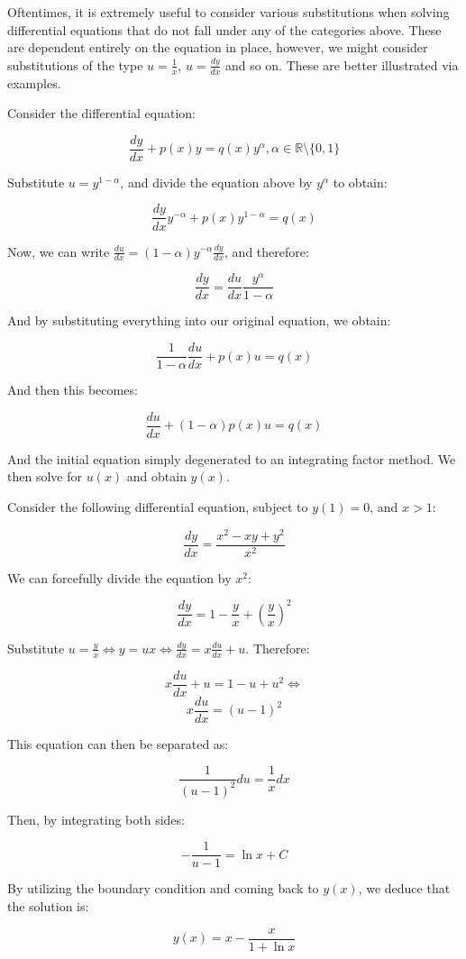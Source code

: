 \documentclass[12pt]{article}
\begin{document}
Oftentimes, it is extremely useful to consider various substitutions when solving differential equations that do not fall under any of the categories above. These are dependent entirely on the equation in place, however, we might consider substitutions of the type $u = \frac{1}{x}$, $u = \frac{dy}{dx}$ and so on. These are better illustrated via examples.

\begin{example}
    Consider the differential equation:

    \[ \frac{dy}{dx} + p(x)y = q(x)y^\alpha, \alpha \in \mathbb{R} \setminus \{0, 1\} \]

    Substitute $u = y^{1 - \alpha}$, and divide the equation above by $y^\alpha$ to obtain:

    \[ \frac{dy}{dx}y^{-\alpha} + p(x)y^{1 - \alpha} = q(x) \]

    Now, we can write $\frac{du}{dx} = (1 - \alpha)y^{-\alpha}\frac{dy}{dx}$, and therefore:

    \[ \frac{dy}{dx} = \frac{du}{dx}\frac{y^\alpha}{1 - \alpha} \]

    And by substituting everything into our original equation, we obtain:

    \[ \frac{1}{1 - \alpha}\frac{du}{dx} + p(x)u = q(x) \]

    And then this becomes:

    \[ \frac{du}{dx} + (1 - \alpha)p(x)u = q(x) \]

    And the initial equation simply degenerated to an integrating factor method. We then solve for $u(x)$ and obtain $y(x)$.
\end{example}

\begin{example}[Substitutions of the type $u = \frac{y}{x}$]
    Consider the following differential equation, subject to $y(1) = 0$, and $x > 1$: 

    \[ \frac{dy}{dx} = \frac{x^2 - xy + y^2}{x^2} \]

    We can forcefully divide the equation by $x^2$:

    \[ \frac{dy}{dx} = 1 - \frac{y}{x} + \left(\frac{y}{x}\right)^2 \]

    Substitute $u = \frac{y}{x} \Leftrightarrow y = ux \Leftrightarrow \frac{dy}{dx} = x\frac{du}{dx} + u$. Therefore:

    \[ x\frac{du}{dx} + u = 1 - u + u^2 \Leftrightarrow \]
    \[ x\frac{du}{dx} = (u - 1)^2 \]

    This equation can then be separated as:

    \[ \frac{1}{(u - 1)^2}du = \frac{1}{x}dx \]

    Then, by integrating both sides:

    \[ -\frac{1}{u - 1} = \ln{x} + C \]

    By utilizing the boundary condition and coming back to $y(x)$, we deduce that the solution is:

    \[ y(x) = x - \frac{x}{1 + \ln{x}} \]
    
\end{example}
\end{document}
